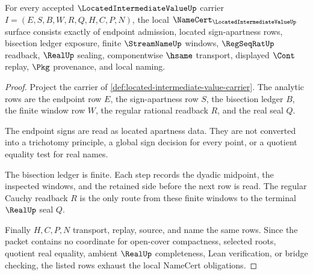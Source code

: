 \begin{theorem}
\label{thm:located-intermediate-value-namecert-obligations}
For every accepted $\LocatedIntermediateValueUp$ carrier $I=(E,S,B,W,R,Q,H,C,P,N)$, the local $\NameCert_{\LocatedIntermediateValueUp}$ surface consists exactly of endpoint admission, located sign-apartness rows, bisection ledger exposure, finite $\StreamNameUp$ windows, $\RegSeqRatUp$ readback, $\RealUp$ sealing, componentwise $\hsame$ transport, displayed $\Cont$ replay, $\Pkg$ provenance, and local naming.
\end{theorem}
\begin{proof}
Project the carrier of \autoref{def:located-intermediate-value-carrier}. The analytic rows are the endpoint row $E$, the sign-apartness row $S$, the bisection ledger $B$, the finite window row $W$, the regular rational readback $R$, and the real seal $Q$.

The endpoint signs are read as located apartness data. They are not converted into a trichotomy principle, a global sign decision for every point, or a quotient equality test for real names.

The bisection ledger is finite. Each step records the dyadic midpoint, the inspected windows, and the retained side before the next row is read. The regular Cauchy readback $R$ is the only route from these finite windows to the terminal $\RealUp$ seal $Q$.

Finally $H,C,P,N$ transport, replay, source, and name the same rows. Since the packet contains no coordinate for open-cover compactness, selected roots, quotient real equality, ambient $\RealUp$ completeness, Lean verification, or bridge checking, the listed rows exhaust the local NameCert obligations.
\end{proof}

